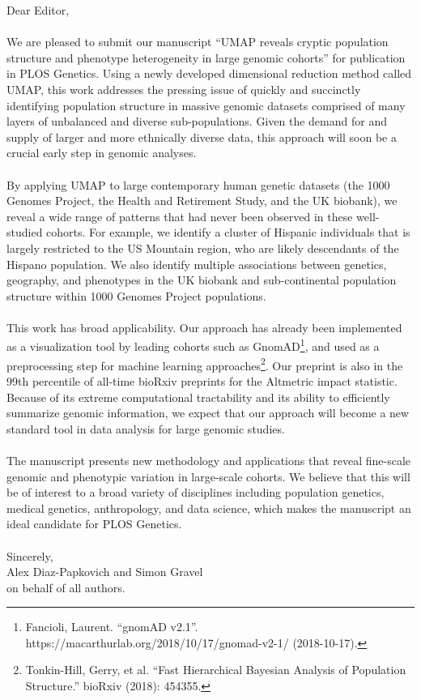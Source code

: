 \documentclass{article}
\begin{document}
Dear Editor,
\\\\
We are pleased to submit our manuscript ``UMAP reveals cryptic population structure and phenotype heterogeneity in large genomic cohorts'' for publication in PLOS Genetics. Using a newly developed dimensional reduction method called UMAP, this work addresses the pressing issue of quickly and succinctly identifying population structure in massive genomic datasets comprised of many layers of unbalanced and diverse sub-populations. Given the demand for and supply of larger and more ethnically diverse data, this approach will soon be a crucial early step in genomic analyses.
\\\\
By applying UMAP to large contemporary human genetic datasets (the 1000 Genomes Project, the Health and Retirement Study, and the UK biobank), we reveal a wide range of patterns that had never been observed in these well-studied cohorts. For example, we identify a cluster of Hispanic individuals that is largely restricted to the US Mountain region, who are likely descendants of the Hispano population. We also identify multiple associations between genetics, geography, and phenotypes in the UK biobank and sub-continental population structure within 1000 Genomes Project populations.
\\\\
This work has broad applicability. Our approach has already been implemented as a visualization tool by leading cohorts such as GnomAD\footnote{Fancioli, Laurent. ``gnomAD v2.1''. https://macarthurlab.org/2018/10/17/gnomad-v2-1/ (2018-10-17).}, and used as a preprocessing step for machine learning approaches\footnote{Tonkin-Hill, Gerry, et al. ``Fast Hierarchical Bayesian Analysis of Population Structure.'' bioRxiv (2018): 454355.}. Our preprint is also in the 99th percentile of all-time bioRxiv preprints for the Altmetric impact statistic. Because of its extreme computational tractability and its ability to efficiently summarize genomic information, we expect that our approach will become a new standard tool in data analysis for large genomic studies. 
\\\\
The manuscript presents new methodology and applications that reveal fine-scale genomic and phenotypic variation in large-scale cohorts.  We believe that this will be of interest to a broad variety of disciplines including population genetics, medical genetics, anthropology, and data science, which makes the manuscript an ideal candidate for PLOS Genetics.
\\
\\
Sincerely,
\\
Alex Diaz-Papkovich and Simon Gravel
\\
on behalf of all authors.
\end{document}
